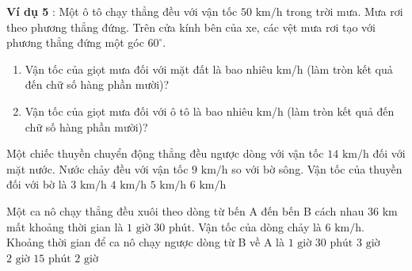 \noindent\textbf{Ví dụ 5} : Một ô tô chạy thẳng đều với vận tốc $50\text{ km/h}$ trong trời mưa. Mưa rơi theo phương thẳng đứng. Trên cửa kính bên của xe, các vệt mưa rơi tạo với phương thẳng đứng một góc $60^\circ$.
\begin{enumerate}[\bfseries a)]
    \item Vận tốc của giọt mưa đối với mặt đất là bao nhiêu km/h (làm tròn kết quả đến chữ số hàng phần mười)?
    \item Vận tốc của giọt mưa đối với ô tô là bao nhiêu km/h (làm tròn kết quả đến chữ số hàng phần mười)?
\end{enumerate}

\begin{ex}
Một chiếc thuyền chuyển động thẳng đều ngược dòng với vận tốc $14\text{ km/h}$ đối với mặt nước. Nước chảy đều với vận tốc $9\text{ km/h}$ so với bờ sông. Vận tốc của thuyền đối với bờ là
\choice
{$3\text{ km/h}$}
{$4\text{ km/h}$}
{\True $5\text{ km/h}$}
{$6\text{ km/h}$}
\end{ex}

\begin{ex}
Một ca nô chạy thẳng đều xuôi theo dòng từ bến A đến bến B cách nhau $36\text{ km}$ mất khoảng thời gian là $1\text{ giờ } 30\text{ phút}$. Vận tốc của dòng chảy là $6\text{ km/h}$. Khoảng thời gian để ca nô chạy ngược dòng từ B về A là
\choice
{$1\text{ giờ } 30\text{ phút}$}
{\True $3\text{ giờ}$}
{$2\text{ giờ } 15\text{ phút}$}
{$2\text{ giờ}$}
\end{ex}

